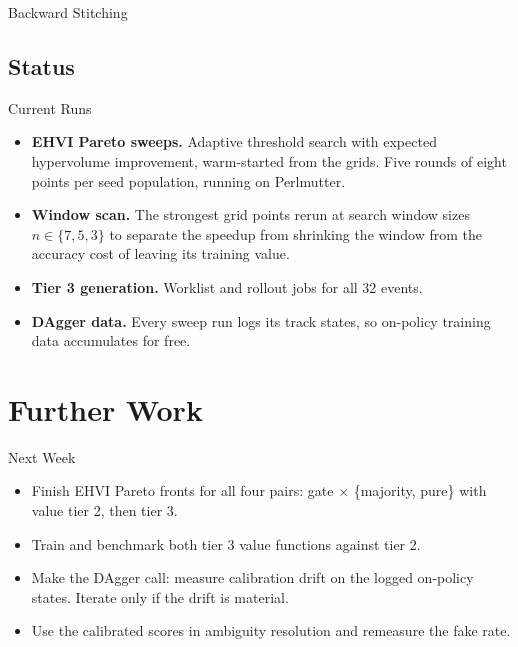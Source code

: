 \documentclass[aspectratio=169]{beamer}
\begin{document}
\begin{frame}{Backward Stitching}
{
  }%
\end{frame}

\subsection{Status}

\begin{frame}{Current Runs}
  \begin{itemize}
    \item \textbf{EHVI Pareto sweeps.} Adaptive threshold search with expected
      hypervolume improvement, warm-started from the grids. Five rounds of
      eight points per seed population, running on Perlmutter.
    \item \textbf{Window scan.} The strongest grid points rerun at search
      window sizes $n \in \{7, 5, 3\}$ to separate the speedup from shrinking
      the window from the accuracy cost of leaving its training value.
    \item \textbf{Tier 3 generation.} Worklist and rollout jobs for all 32
      events.
    \item \textbf{DAgger data.} Every sweep run logs its track states, so
      on-policy training data accumulates for free.
  \end{itemize}
\end{frame}

\section{Further Work}

\begin{frame}{Next Week}
  \begin{itemize}
    \item Finish EHVI Pareto fronts for all four pairs: gate $\times$
      \{majority, pure\} with value tier 2, then tier 3.
    \item Train and benchmark both tier 3 value functions against tier 2.
    \item Make the DAgger call: measure calibration drift on the logged
      on-policy states. Iterate only if the drift is material.
    \item Use the calibrated scores in ambiguity resolution and remeasure
      the fake rate.
  \end{itemize}
\end{frame}
\end{document}
